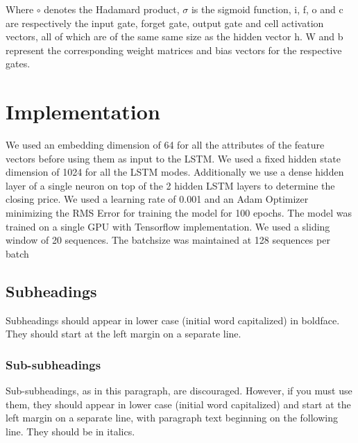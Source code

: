 \documentclass{article}
\begin{document}
Where $\circ$ denotes the Hadamard product, $\sigma$ is the sigmoid function, i, f, o and c are respectively the input gate, forget gate, output gate and cell activation vectors, all of which are of the same same size as the hidden vector h. W and b represent the corresponding weight matrices and bias vectors for the respective gates.

\section{Implementation}
\label{sec:implementation}

We used an embedding dimension of 64 for all the attributes of the feature vectors before using them as input to the LSTM. We used a fixed hidden state dimension of 1024 for all the LSTM modes. Additionally we use a dense hidden layer of a single neuron on top of the 2 hidden LSTM layers to determine the closing price. We used a learning rate of 0.001 and an Adam Optimizer minimizing the RMS Error for training the model for 100 epochs. The model was trained on a single GPU with Tensorflow implementation. We used a sliding window of 20 sequences. The batchsize was maintained at 128 sequences per batch

\subsection{Subheadings}
\label{ssec:subhead}

Subheadings should appear in lower case (initial word capitalized) in
boldface.  They should start at the left margin on a separate line.
 
\subsubsection{Sub-subheadings}
\label{sssec:subsubhead}

Sub-subheadings, as in this paragraph, are discouraged. However, if you
must use them, they should appear in lower case (initial word
capitalized) and start at the left margin on a separate line, with paragraph
text beginning on the following line.  They should be in italics.



\end{document}
